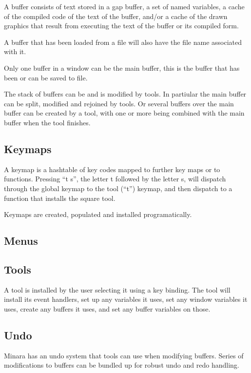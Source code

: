 A buffer consists of text stored in a gap buffer, a set of named variables, a cache of the compiled code of the text of the buffer, and/or a cache of the drawn graphics that result from executing the text of the buffer or its compiled form.

A buffer that has been loaded from a file will also have the file name associated with it.

Only one buffer in a window can be the main buffer, this is the buffer that has been or can be saved to file.

The stack of buffers can be and is modified by tools. In partiular the main buffer can be split, modified and rejoined by tools. Or several buffers over the main buffer can be created by a tool, with one or more being combined with the main buffer when the tool finishes.

\subsection{Keymaps}

A keymap is a hashtable of key codes mapped to further key maps or to functions. Pressing ``t s'', the letter t followed by the letter s, will dispatch through the global keymap to the tool (``t'') keymap, and then dispatch to a function that installs the square tool.

Keymaps are created, populated and installed programatically.

\subsection{Menus}

\subsection{Tools}

A tool is installed by the user selecting it using a key binding. The tool will install its event handlers, set up any variables it uses, set any window variables it uses, create any buffers it uses, and set any buffer variables on those.

\subsection{Undo}

Minara has an undo system that tools can use when modifying buffers. Series of modifications to buffers can be bundled up for robust undo and redo handling.

